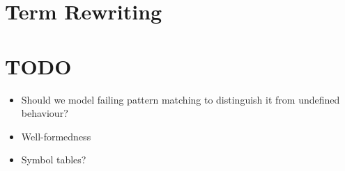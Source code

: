 \documentclass{article}
\begin{document}
\section{Term Rewriting}

\section*{TODO}

\begin{itemize}
\item Should we model failing pattern matching to distinguish it
  from undefined behaviour?
\item Well-formedness
\item Symbol tables?
\end{itemize}
\end{document}
